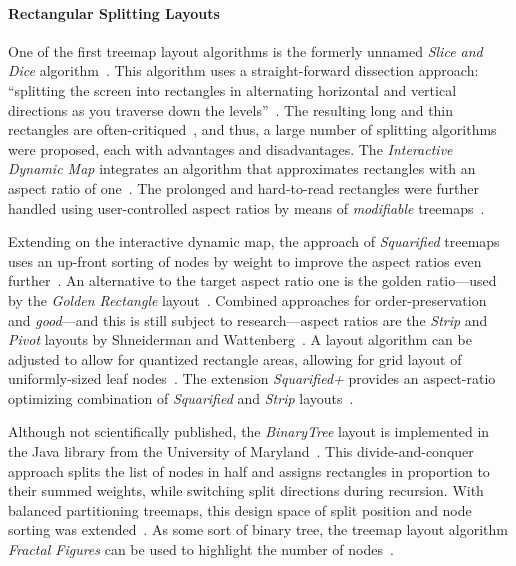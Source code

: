 \documentclass[sigconf%
,natbib=true%
]{acmart}
\begin{document}
\paragraph{\textbf{Rectangular Splitting Layouts}}
One of the first treemap layout algorithms is the formerly unnamed \emph{Slice and Dice} algorithm~\cite{johnson1991-spacefilling}.
This algorithm uses a straight-forward dissection approach: \enquote{splitting the screen into rectangles in alternating horizontal and vertical directions as you traverse down the levels}~\cite{shneiderman2009-treemaps}.
The resulting long and thin rectangles are often-critiqued~\cite{hahn2013-varyinghierarchies}, and thus, a large number of splitting algorithms were proposed, each with advantages and disadvantages.
The \emph{Interactive Dynamic Map} integrates an algorithm that approximates rectangles with an aspect ratio of one~\cite{zizi1994-hyperdocuments}.
The prolonged and hard-to-read rectangles were further handled using user-controlled aspect ratios by means of \emph{modifiable} treemaps~\cite{vernier2000-modifiable}.
\par
Extending on the interactive dynamic map, the approach of \emph{Squarified} treemaps uses an up-front sorting of nodes by weight to improve the aspect ratios even further~\cite{bruls2000-squarified}.
An alternative to the target aspect ratio one is the golden ratio---used by the \emph{Golden Rectangle} layout~\cite{lu2017-goldenrectangle}.
Combined approaches for order-preservation and \emph{good}---and this is still subject to research---aspect ratios are the \emph{Strip} and \emph{Pivot} layouts by Shneiderman and Wattenberg~\cite{shneiderman2001-ordered}.
A layout algorithm can be adjusted to allow for quantized rectangle areas, allowing for grid layout of uniformly-sized leaf nodes~\cite{bederson2002-quantum}.
The extension \emph{Squarified+} provides an aspect-ratio optimizing combination of \emph{Squarified} and \emph{Strip} layouts~\cite{cesarano2016-heuristic}.
\par
Although not scientifically published, the \emph{BinaryTree} layout is implemented in the Java library from the University of Maryland~\cite{shneiderman2009-treemaps}.
This divide-and-conquer approach splits the list of nodes in half and assigns rectangles in proportion to their summed weights, while switching split directions during recursion.
With balanced partitioning treemaps, this design space of split position and node sorting was extended~\cite{feng2019-balancedpartitioning}.
As some sort of binary tree, the treemap layout algorithm \emph{Fractal Figures} can be used to highlight the number of nodes~\cite{dambros2005-fractal}.
\end{document}
